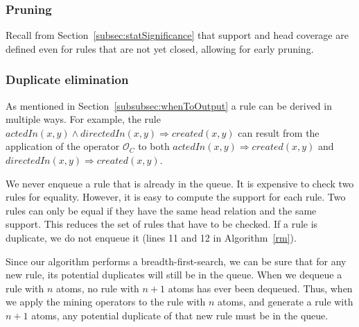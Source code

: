 \subsubsection{Pruning} 
\label{subsubsec:pruning}
Recall from Section~\ref{subsec:statSignificance} that support and head coverage are defined even for rules that are not yet closed, allowing for early pruning.

\subsubsection{Duplicate elimination} 
\label{subsubsec:duplicateElimination}
As mentioned in Section~\ref{subsubsec:whenToOutput} a rule can be derived in multiple ways.
For example, the rule $actedIn(x,y) \wedge directedIn(x,y) \Rightarrow created(x,y)$ can result from the application
of the operator $\mathcal{O}_C$ to both $actedIn(x,y) \Rightarrow created(x,y)$ and $directedIn(x,y) \Rightarrow created(x,y)$.


We never enqueue a rule that is already in the queue. It is expensive to check two rules for equality.
However, it is easy to compute the support for each rule. Two rules can only be equal if they have the same head relation and
the same support. This reduces the set of rules that have to be checked. If a rule is duplicate, we do not enqueue it (lines 11 and 12 in Algorithm~\ref{rm}).

Since our algorithm performs a breadth-first-search, we can be sure that for any new rule, its potential duplicates will still be in the queue.
When we dequeue a rule with $n$ atoms, no rule with $n+1$ atoms has ever been dequeued. Thus, when we apply the mining operators to the rule with $n$ atoms, and generate a rule with $n+1$ atoms,
any potential duplicate of that new rule must be in the queue.

